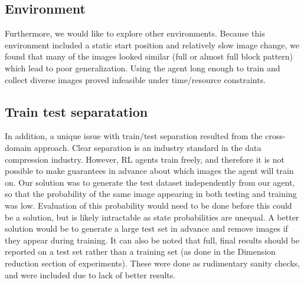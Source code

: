 \subsection{Environment}
Furthermore, we would like to explore other environments. Because this
environment included a static start position and relatively slow image change,
we found that many of the images looked similar (full or almost full block
pattern) which lead to poor generalization. Using the agent long enough to train
and collect diverse images proved infeasible under time/resource constraints.\\

\subsection{Train test separatation}
In addition, a unique issue with train/test separation resulted from the
cross-domain approach. Clear separation is an industry standard in the data
compression industry. However, RL agents train freely, and therefore it is not
possible to make guarantees in advance about which images the agent will train
on. Our solution was to generate the test dataset independently from our agent,
so that the probability of the same image appearing in both testing and training
was low. Evaluation of this probability would need to be done before this could
be a solution, but is likely intractable as state probabilities are unequal. A
better solution would be to generate a large test set in advance and remove
images if they appear during training. It can also be noted that full, final
results should be reported on a test set rather than a training set (as done in
the Dimension reduction section of experiments). These were done as rudimentary
sanity checks, and were included due to lack of better results.\\
